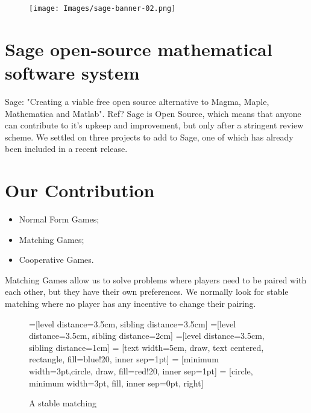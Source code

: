 \documentclass[a0,landscape]{a0poster}
\begin{document}
\begin{multicols}{3}


\begin{figure}[H]
\centering
\texttt{[image: Images/sage-banner-02.png]}
\end{figure}

\color{Brown}
\section*{Sage open-source mathematical software system}
Sage: "Creating a viable free open source alternative to Magma, Maple, Mathematica and Matlab".
Ref?
Sage is Open Source, which means that anyone can contribute to it's upkeep and improvement, but only after a stringent review scheme.
We settled on three projects to add to Sage, one of which has already been included in a recent release.

\section*{Our Contribution}
\begin{itemize}
    \item Normal Form Games;
    \item Matching Games;
    \item Cooperative Games.
\end{itemize}

Matching Games allow us to solve problems where players need to be paired with each other, but they have their own preferences.
We normally look for stable matching where no player has any incentive to change their pairing.

\begin{figure}[H]
\color{Black}
\centering
{}=[level distance=3.5cm, sibling distance=3.5cm]
=[level distance=3.5cm, sibling distance=2cm]
=[level distance=3.5cm, sibling distance=1cm]
 = [text width=5em, draw, text centered, rectangle, fill=blue!20, inner sep=1pt]
 = [minimum width=3pt,circle,  draw, fill=red!20, inner sep=1pt]
 = [circle, minimum width=3pt, fill, inner sep=0pt, right]
\caption{A stable matching}
\label{fig:matching_game}
\end{figure}


\end{multicols}
\end{document}
